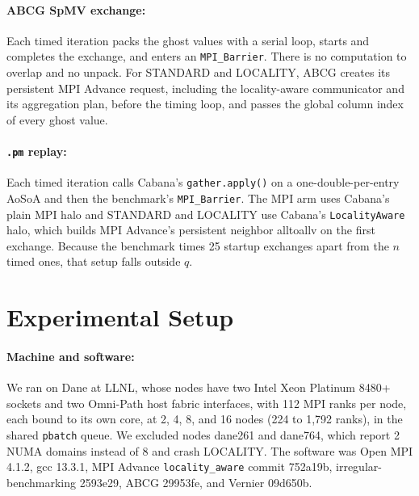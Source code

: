 \documentclass[11pt]{article}
\newcommand{\pmrep}{\texttt{.pm} replay}
\begin{document}
\paragraph{ABCG SpMV exchange:} Each timed iteration packs the ghost values with a serial
loop, starts and completes the exchange, and enters an \texttt{MPI\_Barrier}. There is no
computation to overlap and no unpack. For STANDARD and LOCALITY, ABCG creates its persistent
MPI Advance request, including the locality-aware communicator and its aggregation plan,
before the timing loop, and passes the global column index of every ghost value.

\paragraph{\pmrep:} Each timed iteration calls Cabana's \texttt{gather.apply()} on a
one-double-per-entry AoSoA and then the benchmark's \texttt{MPI\_Barrier}. The MPI arm uses
Cabana's plain MPI halo and STANDARD and LOCALITY use Cabana's \texttt{LocalityAware}
halo, which builds MPI Advance's persistent neighbor alltoallv on the first exchange.
Because the benchmark times 25 startup exchanges apart from the $n$ timed ones, that setup
falls outside $q$.

\section{Experimental Setup}
\label{sec:setup}

\paragraph{Machine and software:} We ran on Dane at LLNL, whose nodes have two Intel Xeon
Platinum 8480+ sockets and two Omni-Path host fabric interfaces, with 112 MPI ranks per
node, each bound to its own core, at 2, 4, 8, and 16 nodes (224 to 1,792 ranks), in the
shared \texttt{pbatch} queue. We excluded nodes dane261 and dane764, which report 2 NUMA
domains instead of 8 and crash LOCALITY. The software was Open MPI 4.1.2, gcc 13.3.1, MPI
Advance \texttt{locality\_aware} commit 752a19b, irregular-benchmarking 2593e29, ABCG
29953fe, and Vernier 09d650b.
\end{document}
